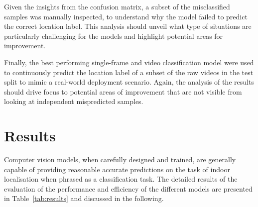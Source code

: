 \documentclass[a4paper]{article}
\begin{document}
Given the insights from the confusion matrix, a subset of the misclassified
samples was manually inspected, to understand why the model failed to predict 
the correct location label. This analysis should unveil what type of situations
are particularly challenging for the models and highlight potential areas for
improvement.

Finally, the best performing single-frame and video classification model were
used to continuously predict the location label of a subset of the raw videos in
the test split to mimic a real-world deployment scenario. Again, the analysis 
of the results should drive focus to potential areas of improvement that are not
visible from looking at independent mispredicted samples.



\section{Results} %
\label{sec:results}


Computer vision models, when carefully designed and trained, are generally
capable of providing reasonable accurate predictions on the task of indoor
localisation when phrased as a classification task. The detailed results of the
evaluation of the performance and efficiency of the different models are
presented in Table~\ref{tab:results} and discussed in the following.
\end{document}
